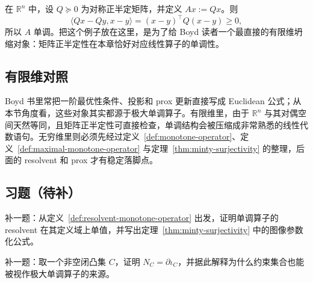 \begin{example}[正半定矩阵诱导的线性单调算子]
在 $\mathbb R^n$ 中，设 $Q\succeq 0$ 为对称正半定矩阵，并定义 $A x:=Qx$。则
\[
\langle Qx-Qy,x-y\rangle=(x-y)^\top Q(x-y)\ge 0,
\]
所以 $A$ 单调。把这个例子放在这里，是为了给 Boyd 读者一个最直接的有限维坍缩对象：矩阵正半定性在本章恰好对应线性算子的单调性。
\end{example}

\subsection*{有限维对照}

Boyd 书里常把一阶最优性条件、投影和 prox 更新直接写成 Euclidean 公式；从本节角度看，这些对象其实都源于极大单调算子。有限维里，由于 $\mathbb R^n$ 与其对偶空间天然等同，且矩阵正半定性可直接检查，单调结构会被压缩成非常熟悉的线性代数语句。无穷维里则必须先经过定义~\ref{def:monotone-operator}、定义~\ref{def:maximal-monotone-operator} 与定理~\ref{thm:minty-surjectivity} 的整理，后面的 resolvent 和 prox 才有稳定落脚点。

\subsection*{习题（待补）}

\begin{exercise}
补一题：从定义~\ref{def:resolvent-monotone-operator} 出发，证明单调算子的 resolvent 在其定义域上单值，并写出定理~\ref{thm:minty-surjectivity} 中的图像参数化公式。
\end{exercise}

\begin{exercise}[法锥与极大单调桥接题占位]
补一题：取一个非空闭凸集 $C$，证明 $N_C=\partial \iota_C$，并据此解释为什么约束集合也能被视作极大单调算子的来源。
\end{exercise}

